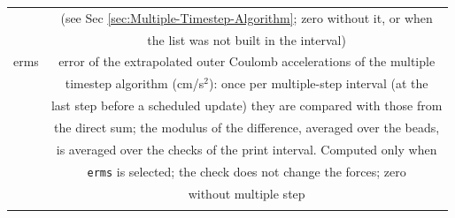 \begin{longtable}{cc}
 & \quad{}(see Sec \ref{sec:Multiple-Timestep-Algorithm}; zero without it, or when\tabularnewline
 & \quad{}the list was not built in the interval)\tabularnewline
erms  & error of the extrapolated outer Coulomb accelerations of the multiple\tabularnewline
 & \quad{}timestep algorithm (cm/s$^{2}$): once per multiple-step interval (at the\tabularnewline
 & \quad{}last step before a scheduled update) they are compared with those from\tabularnewline
 & \quad{}the direct sum; the modulus of the difference, averaged over the beads,\tabularnewline
 & \quad{}is averaged over the checks of the print interval. Computed only when\tabularnewline
 & \quad{}\texttt{erms} is selected; the check does not change the forces; zero\tabularnewline
 & \quad{}without multiple step\tabularnewline
\hline
\label{tab:outputlist}  & \tabularnewline
\end{longtable}
